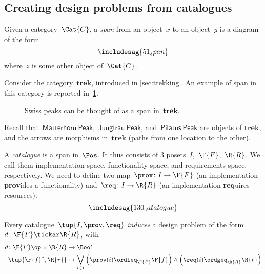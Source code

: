 \subsection{Creating design problems from catalogues}
\begin{shaded*}
\begin{definition}[Span]
Given a category~$\Cat{C}$, a \emph{span} from an object~$x$ to an object~$y$ is a diagram of the form
\begin{equation}
\includesag{51_span}
\end{equation}
where~$z$ is some other object of~$\Cat{C}$. 
\end{definition}
\end{shaded*}
\begin{example}
Consider the category~$\mathbf{trek}$, introduced in \cref{sec:trekking}. An example of span in this category is reported in~\cref{fig:exmountains}.
\begin{figure}[h!]
\begin{center}
\end{center}
\caption{Swiss peaks can be thought of as a span in~$\mathbf{trek}$. \label{fig:exmountains}}
\end{figure}
Recall that~$\mathsf{Matterhorn \ Peak}$,~$\mathsf{Jungfrau \ Peak}$, and~$\mathsf{Pilatus \ Peak}$ are objects of $\mathbf{trek}$, and the arrows are morphisms in~$\mathbf{trek}$ (paths from one location to the other).
\end{example}

\begin{definition}[Catalogue] \label{def:catalogue}
A \emph{catalogue} is a span in~$\Pos$.
It thus consists of 3 posets~$I$,~$\F{F}$,~$\R{R}$.
We call them implementation space, functionality space, and requirements space, respectively. We need to define two map~$\prov \colon I \to \F{F}$ (an implementation \textbf{prov}ides a functionality) and~$\req\colon I \to \R{R}$ (an implementation \textbf{req}uires resources). 
\begin{equation}
\includesag{130_catalogue}
\end{equation}
\end{definition}

\begin{definition}
Every catalogue~$\tup{I,\prov,\req}$ \emph{induces} a design problem of the form~$d\colon \F{F}\tickar \R{R}$, with
\begin{equation}
    \begin{aligned}
    d\colon \F{F}\op \times \R{R}&\to \Bool\\
    \tup{\F{f}^*,\R{r}}&\mapsto \bigvee_{i\in I}\left(\prov(i)\ordleq_{\F{F}}\F{f} \right)\wedge \left( \req(i)\ordgeq_{\R{R}}\R{r}\right)
    \end{aligned}
\end{equation}
\end{definition}

